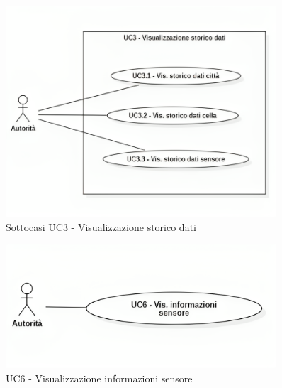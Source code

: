 \begin{figure}[H]
    \centering
    \includegraphics[width=0.9\textwidth]{../Images/uc3_Subcase.png}
    \caption{Sottocasi UC3 - Visualizzazione storico dati }
    \label{fig:UC3_sub}
\end{figure}







\begin{figure}[H]
    \centering
    \includegraphics[width=0.9\textwidth]{../Images/uc6.png}
    \caption{UC6 - Visualizzazione informazioni sensore}
    \label{fig:UC6}
\end{figure}


